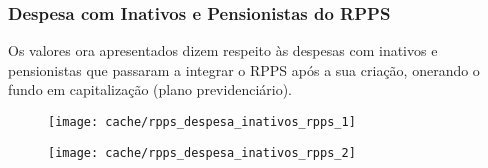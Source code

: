 
\subsubsection{Despesa com Inativos e Pensionistas do RPPS}

Os valores ora apresentados dizem respeito às despesas com inativos e pensionistas que passaram a integrar o RPPS após a sua criação, onerando o fundo em capitalização (plano previdenciário).





\begin{figure}[H]
\center
\texttt{[image: cache/rpps\_despesa\_inativos\_rpps\_1]}
\end{figure}

\begin{figure}[H]
\center
\texttt{[image: cache/rpps\_despesa\_inativos\_rpps\_2]}
\end{figure}

